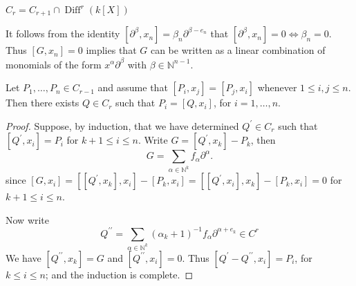 \documentclass[12pt, oneside]{book}
\begin{document}
\begin{lemma}
    $ C_r=C_{r+1} \cap \operatorname{Diff}^r(k[X])$
\end{lemma}



\begin{lemma}
    It follows from the identity $\left[\partial^\beta, x_n\right]=\beta_n \partial^{\beta-e_n}$
    that $\left[\partial^\beta, x_n\right]= 0\Leftrightarrow \beta_n=0$.
    Thus $\left[G, x_n\right]=0$ implies that $G$ can be written as a linear combination of monomials of the form $x^\alpha \partial^\beta$ with $\beta \in \mathbb{N}^{n-1}$.
\end{lemma}

\begin{lemma}
    Let $P_1, \ldots, P_n \in C_{r-1}$ and assume that $\left[P_i, x_j\right]=\left[P_j, x_i\right]$ whenever $1 \leq i, j \leq n$. Then there exists $Q \in C_r$ such that $P_i=\left[Q, x_i\right]$, for $i=1, \ldots, n$.

    \begin{proof}
        Suppose, by induction, that we have determined $Q^{\prime} \in C_r$ such that $\left[Q^{\prime}, x_i\right]=P_i$ for $k+1 \leq i \leq n$.
        Write $G=[Q^\prime,x_k]-P_k$, then
        \begin{equation*}
            G
            =
            \sum_{\alpha \in \mathbb{N}^k} f_\alpha \partial^\alpha.
        \end{equation*}
        since $\left[G, x_i\right]=[[Q^\prime,x_k],x_i]-[P_k,x_i]=[[Q^\prime,x_i],x_k]-[P_k,x_i]=0$ for $k+1 \leq i \leq n$.

        Now write
        \begin{equation*}
            Q^{\prime \prime}=\sum_{\alpha \in \mathbb{N}^k}\left(\alpha_k+1\right)^{-1} f_\alpha \partial^{\alpha+e_k} \in C^r
        \end{equation*}
        We have $[Q^{\prime\prime},x_k]=G$ and $\left[Q^{\prime \prime}, x_i\right]=0$.
        Thus $\left[Q^{\prime}-Q^{\prime \prime}, x_i\right]=P_i$, for $k \leq i \leq n$; and the induction is complete.
    \end{proof}
\end{lemma}
\end{document}
